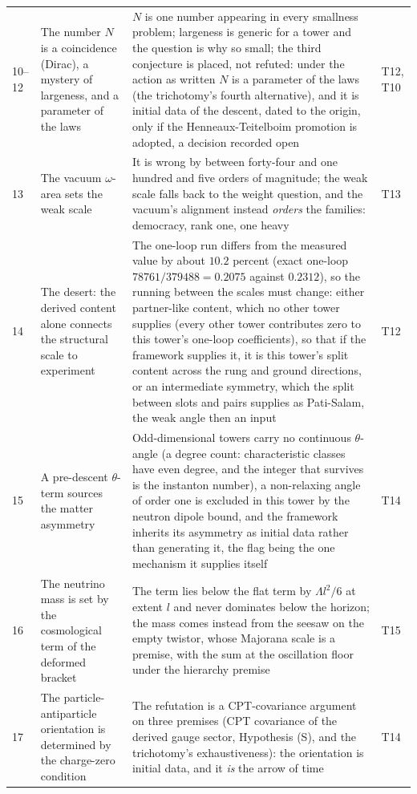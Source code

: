 \documentclass[11pt]{article}
\theoremstyle{definition}
\theoremstyle{plain}
\begin{document}
\begin{longtable}{p{} p{} p{} p{}}
10--12 & The number $N$ is a coincidence (Dirac), a mystery of largeness, and a parameter of the laws & $N$ is one number appearing in every smallness problem; largeness is generic for a tower and the question is why so small; the third conjecture is placed, not refuted: under the action as written $N$ is a parameter of the laws (the trichotomy's fourth alternative), and it is initial data of the descent, dated to the origin, only if the Henneaux-Teitelboim promotion is adopted, a decision recorded open & T12, T10 \\
13 & The vacuum $\omega$-area sets the weak scale & It is wrong by between forty-four and one hundred and five orders of magnitude; the weak scale falls back to the weight question, and the vacuum's alignment instead \emph{orders} the families: democracy, rank one, one heavy & T13 \\
14 & The desert: the derived content alone connects the structural scale to experiment & The one-loop run differs from the measured value by about $10.2$ percent (exact one-loop $78761/379488 = 0.2075$ against $0.2312$), so the running between the scales must change: either partner-like content, which no other tower supplies (every other tower contributes zero to this tower's one-loop coefficients), so that if the framework supplies it, it is this tower's split content across the rung and ground directions, or an intermediate symmetry, which the split between slots and pairs supplies as Pati-Salam, the weak angle then an input & T12 \\
15 & A pre-descent $\theta$-term sources the matter asymmetry & Odd-dimensional towers carry no continuous $\theta$-angle (a degree count: characteristic classes have even degree, and the integer that survives is the instanton number), a non-relaxing angle of order one is excluded in this tower by the neutron dipole bound, and the framework inherits its asymmetry as initial data rather than generating it, the flag being the one mechanism it supplies itself & T14 \\
16 & The neutrino mass is set by the cosmological term of the deformed bracket & The term lies below the flat term by $\Lambda l^{2}/6$ at extent $l$ and never dominates below the horizon; the mass comes instead from the seesaw on the empty twistor, whose Majorana scale is a premise, with the sum at the oscillation floor under the hierarchy premise & T15 \\
17 & The particle-antiparticle orientation is determined by the charge-zero condition & The refutation is a CPT-covariance argument on three premises (CPT covariance of the derived gauge sector, Hypothesis (S), and the trichotomy's exhaustiveness): the orientation is initial data, and it \emph{is} the arrow of time & T14 \\
\bottomrule


\end{longtable}
\end{document}
